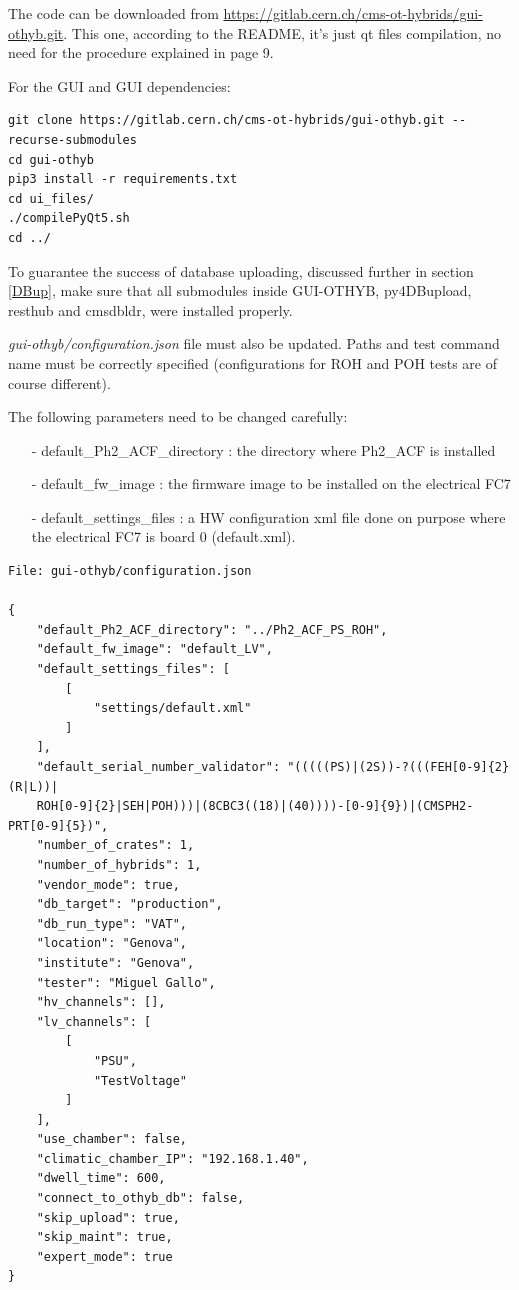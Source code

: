 \documentclass[10pt,a4paper]{article}
\begin{document}
The code can be downloaded from \url{https://gitlab.cern.ch/cms-ot-hybrids/gui-othyb.git}. This one, according to the README, it’s just qt files compilation, no need for the procedure explained in page 9.

For the GUI and GUI dependencies: 

\begin{framed}
\begin{verbatim}
git clone https://gitlab.cern.ch/cms-ot-hybrids/gui-othyb.git --recurse-submodules 
cd gui-othyb
pip3 install -r requirements.txt
cd ui_files/
./compilePyQt5.sh
cd ../

\end{verbatim}
\end{framed}

To guarantee the success of database uploading, discussed further in section \ref{DBup}, make sure that all submodules inside GUI-OTHYB, py4DBupload, resthub and cmsdbldr, were installed properly.

\emph{gui-othyb/configuration.json} file must also be updated. Paths and test command name must be correctly specified (configurations for ROH and POH tests are of course different).

The following parameters need to be changed carefully:
\begin{itemize}
\item[-] default\_Ph2\_ACF\_directory : the directory where Ph2\_ACF is installed
\item[-] default\_fw\_image : the firmware image to be installed on the electrical FC7
\item[-] default\_settings\_files : a HW configuration xml file done on purpose where the electrical FC7 is board 0 (default.xml). 
\end{itemize}

\begin{framed}
\begin{verbatim}
File: gui-othyb/configuration.json

{
    "default_Ph2_ACF_directory": "../Ph2_ACF_PS_ROH",
    "default_fw_image": "default_LV",
    "default_settings_files": [
        [
            "settings/default.xml"
        ]
    ],
    "default_serial_number_validator": "(((((PS)|(2S))-?(((FEH[0-9]{2}(R|L))|
    ROH[0-9]{2}|SEH|POH)))|(8CBC3((18)|(40))))-[0-9]{9})|(CMSPH2-PRT[0-9]{5})",
    "number_of_crates": 1,
    "number_of_hybrids": 1,
    "vendor_mode": true,
    "db_target": "production",
    "db_run_type": "VAT",
    "location": "Genova",
    "institute": "Genova",
    "tester": "Miguel Gallo",
    "hv_channels": [],
    "lv_channels": [
        [
            "PSU",
            "TestVoltage"
        ]
    ],
    "use_chamber": false,
    "climatic_chamber_IP": "192.168.1.40",
    "dwell_time": 600,
    "connect_to_othyb_db": false,
    "skip_upload": true,
    "skip_maint": true,
    "expert_mode": true
}

\end{verbatim}
\end{framed}
\end{document}
